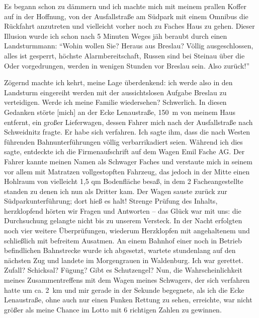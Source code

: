 Es begann schon zu dämmern und ich machte mich mit meinem prallen Koffer auf in der Hoffnung, von der Ausfallstraße am Südpark mit einem Omnibus die Rückfahrt anzutreten und vielleicht vorher noch zu Faches Haus zu gehen. Dieser Illusion wurde ich schon nach 5 Minuten Weges jäh beraubt durch einen Landsturmmann: \enquote{Wohin wollen Sie? Heraus aus Breslau? Völlig ausgeschlossen, alles ist gesperrt, höchste Alarmbereitschaft, Russen sind bei Steinau über die Oder vorgedrungen, werden in wenigen Stunden vor Breslau sein. Also zurück!}

 Zögernd machte ich kehrt, meine Lage überdenkend: ich werde also in den Landsturm eingereiht werden mit der aussichtslosen Aufgabe Breslau zu verteidigen. Werde ich meine Familie wiedersehen? Schwerlich. In diesen Gedanken störte [mich] an der Ecke Lenaustraße, 150~m von meinem Haus entfernt, ein großer Lieferwagen, dessen Fahrer mich nach der Ausfallstraße nach Schweidnitz fragte. Er habe sich verfahren. Ich sagte ihm, dass die nach Westen führenden Bahnunterführungen völlig verbarrikadiert seien. Während ich dies sagte, entdeckte ich die Firmenaufschrift auf dem Wagen Emil Fache AG. Der Fahrer kannte meinen Namen als Schwager Faches und verstaute mich in seinem vor allem mit Matratzen vollgestopften Fahrzeug, das jedoch in der Mitte einen Hohlraum von vielleicht 1,5 qm Bodenfläche besaß, in dem 2 Facheangestellte standen zu denen ich nun als Dritter kam. Der Wagen sauste zurück zur Südparkunterführung; dort hieß es halt! Strenge Prüfung des Inhalts, herzklopfend hörten wir Fragen und Antworten -- das Glück war mit uns: die Durchsuchung gelangte  nicht bis zu unserem Versteck. In der Nacht erfolgten noch vier weitere Überprüfungen, wiederum Herzklopfen mit angehaltenem und schließlich mit befreitem Ausatmen. An einem Bahnhof einer noch in Betrieb befindlichen Bahnstrecke wurde ich abgesetzt, wartete stundenlang auf den nächsten Zug und landete im Morgengrauen in Waldenburg. Ich war gerettet. Zufall? Schicksal? Fügung? Gibt es Schutzengel? Nun, die Wahrscheinlichkeit meines Zusammentreffens mit dem Wagen meines Schwagers, der sich verfahren hatte um ca. 2~km und mir gerade in der Sekunde begegnete, als ich die Ecke Lenaustraße, ohne auch nur einen Funken Rettung zu sehen, erreichte, war nicht größer als meine Chance im Lotto mit 6 richtigen Zahlen zu gewinnen.

